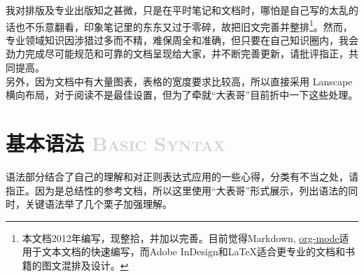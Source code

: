 \documentclass[12pt,a4paper,twoside]{ctexart}
\begin{document}
\begin{tcolorbox}[colback=yellow!5,colframe=red!80!black,title=\textbf{说明}]
  我对排版及专业出版知之甚微，只是在平时笔记和文档时，哪怕是自己写的太乱的话也不乐意翻看，印象笔记里的东东又过于零碎，故把旧文完善并整排\footnote{本文档2012年编写，现整拾，并加以完善。目前觉得Markdown, \href{http://orgmode.org/}{org-mode}适用于文本文档的快速编写，而Adobe InDesign和LaTeX适合更专业的文档和书籍的图文混排及设计。}。然而，专业领域知识因涉猎过多而不精，难保周全和准确，但只要在自己知识圈内，我会劲力完成尽可能规范和可靠的文档呈现给大家，并不断完善更新，请批评指正，共同提高。\\[2ex]
另外，因为文档中有大量图表，表格的宽度要求比较高，所以直接采用 Lanscape 横向布局，对于阅读不是最佳设置，但为了牵就“大表哥”目前折中一下这些处理。\\
\end{tcolorbox}

\section[基本语法]{基本语法 \textcolor{lightgray}{\textsc{Basic Syntax}}}
\label{sec:basic-syntax}

语法部分结合了自己的理解和对正则表达式应用的一些心得，分类有不当之处，请指正。因为是总结性的参考文档，所以这里使用“大表哥”形式展示，列出语法的同时，关键语法举了几个栗子加强理解。\par
\end{document}
